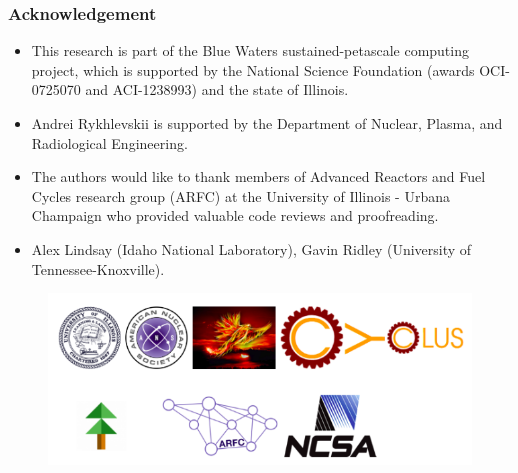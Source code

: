 \begin{frame}
  \frametitle{Acknowledgement}
  \begin{itemize}
    \item This research is part of the Blue Waters sustained-petascale computing project, 
which is supported by the National Science Foundation (awards OCI-0725070 and 
ACI-1238993) and the state of Illinois.
    \item Andrei Rykhlevskii is supported by the Department of Nuclear, Plasma, and Radiological Engineering.
    \item The authors would like to thank  members of Advanced Reactors and Fuel Cycles
research group (ARFC) at the University of Illinois - Urbana Champaign who 
provided valuable code reviews and proofreading.
    \item Alex Lindsay (Idaho National Laboratory), Gavin Ridley (University of Tennessee-Knoxville).
  \end{itemize}
    \begin{figure}[t]
   \hspace*{-0.4in}
   \includegraphics[height=0.35\textheight]{./images/acks.png}
    \end{figure}
\end{frame}
